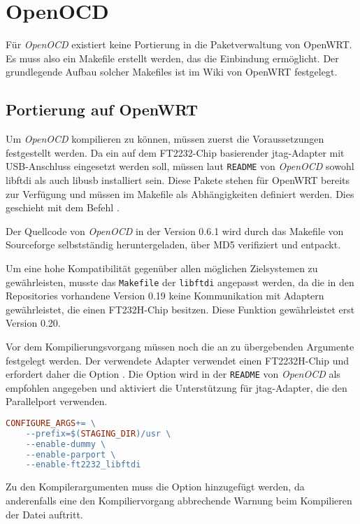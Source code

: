 \section{OpenOCD}
Für \emph{OpenOCD} existiert keine Portierung in die Paketverwaltung von OpenWRT. Es
muss also ein Makefile erstellt werden, das die Einbindung ermöglicht. Der
grundlegende Aufbau solcher Makefiles ist im Wiki von OpenWRT
festgelegt\cite{OWRT}.
\subsection{Portierung auf OpenWRT}
Um \emph{OpenOCD} kompilieren zu können, müssen zuerst die Voraussetzungen festgestellt
werden. Da ein auf dem FT2232-Chip basierender \gls{jtag}-Adapter mit
USB-Anschluss eingesetzt werden soll, müssen laut \texttt{README} von \emph{OpenOCD}
sowohl libftdi als auch libusb installiert sein. Diese Pakete stehen für OpenWRT
bereits zur Verfügung und müssen im Makefile als Abhängigkeiten definiert
werden. Dies geschieht mit dem Befehl .

Der Quellcode von \emph{OpenOCD} in der Version 0.6.1 wird durch das Makefile von
Sourceforge selbstständig heruntergeladen, über MD5 verifiziert und entpackt.

Um eine hohe Kompatibilität gegenüber allen möglichen Zielsystemen zu
gewährleisten, musste das \texttt{Makefile} der \texttt{libftdi} angepasst werden, da die in den
Repositories vorhandene Version 0.19  keine Kommunikation mit Adaptern
gewährleistet, die einen FT232H-Chip besitzen. Diese Funktion gewährleistet erst
Version 0.20.

Vor dem Kompilierungsvorgang müssen noch die an 
zu übergebenden Argumente festgelegt werden. Der verwendete Adapter
verwendet einen FT2232H-Chip und erfordert daher die Option
.
Die Option  wird in der \texttt{README} von \emph{OpenOCD} als
empfohlen angegeben und aktiviert die Unterstützung für \gls{jtag}-Adapter, die
den Parallelport verwenden.

\begin{lstlisting}[language=make]
CONFIGURE_ARGS+= \
	--prefix=$(STAGING_DIR)/usr \
	--enable-dummy \
	--enable-parport \
	--enable-ft2232_libftdi
\end{lstlisting}

Zu den Kompilerargumenten muss die Option
 hinzugefügt werden, da anderenfalls
eine den Kompiliervorgang abbrechende Warnung beim Kompilieren der Datei
 auftritt.
